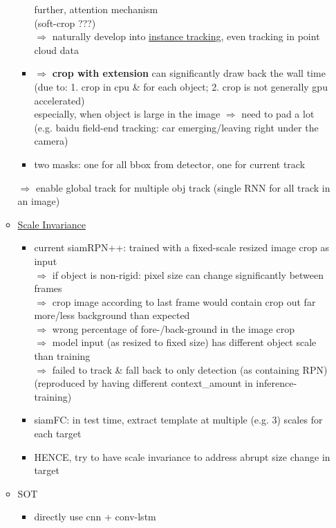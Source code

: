 \begin{itemize}
\begin{itemize}
\begin{itemize}
		further, attention mechanism \\
		(soft-crop ???) \\
		$\Rightarrow$ naturally develop into \underline{instance tracking}, even tracking in point cloud data
		\item $\Rightarrow$ \textbf{crop with extension} can significantly draw back the wall time \\
		(due to: 1. crop in cpu \& for each object; 2. crop is not generally gpu accelerated) \\
		especially, when object is large in the image $\Rightarrow$ need to pad a lot \\
		(e.g. baidu field-end tracking: car emerging/leaving right under the camera)
		\item two masks: one for all bbox from detector, one for current track
		\end{itemize}
		$\Rightarrow$ enable global track for multiple obj track (single RNN for all track in an image)
	\item \underline{Scale Invariance}
		\begin{itemize}
		\item current siamRPN++: trained with a fixed-scale resized image crop as input \\
		$\Rightarrow$ if object is non-rigid: pixel size can change significantly between frames \\
		$\Rightarrow$ crop image according to last frame would contain crop out far more/less background than expected \\
		$\Rightarrow$ wrong percentage of fore-/back-ground in the image crop \\
		$\Rightarrow$ model input (as resized to fixed size) has different object scale than training \\
		$\Rightarrow$ failed to track \& fall back to only detection (as containing RPN) \\
		(reproduced by having different context\_amount in inference-training)
		\item siamFC: in test time, extract template at multiple (e.g. 3) scales for each target
		\item HENCE, try to have scale invariance to address abrupt size change in target
		\end{itemize}
	\item SOT
		\begin{itemize}
		\item directly use cnn + conv-lstm
		\end{itemize}

\end{itemize}
\end{itemize}
